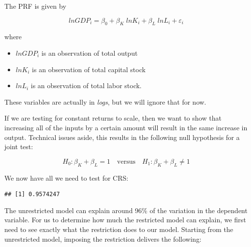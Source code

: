 \documentclass[
]{book}
\newenvironment{Shaded}{\begin{snugshade}}{\end{snugshade}}
\newcommand{\AttributeTok}[1]{\textcolor[rgb]{0.77,0.63,0.00}{#1}}
\newcommand{\CommentTok}[1]{\textcolor[rgb]{0.56,0.35,0.01}{\textit{#1}}}
\newcommand{\FunctionTok}[1]{\textcolor[rgb]{0.00,0.00,0.00}{#1}}
\newcommand{\NormalTok}[1]{#1}
\newcommand{\OtherTok}[1]{\textcolor[rgb]{0.56,0.35,0.01}{#1}}
\newcommand{\SpecialCharTok}[1]{\textcolor[rgb]{0.00,0.00,0.00}{#1}}
\newcommand{\StringTok}[1]{\textcolor[rgb]{0.31,0.60,0.02}{#1}}
\begin{document}
The PRF is given by

\[lnGDP_i = \beta_0 + \beta_K \;lnK_i + \beta_L \;lnL_i + \varepsilon_i\]

where

\begin{itemize}
\item
  \(lnGDP_i\) is an observation of total output
\item
  \(lnK_i\) is an observation of total capital stock
\item
  \(lnL_i\) is an observation of total labor stock.
\end{itemize}

These variables are actually in \emph{logs}, but we will ignore that for now.

If we are testing for constant returns to scale, then we want to show that increasing all of the inputs by a certain amount will result in the same increase in output. Technical issues aside, this results in the following null hypothesis for a joint test:

\[H_0: \beta_K + \beta_L = 1 \quad \text{versus} \quad H_1: \beta_K + \beta_L \neq 1\]

We now have all we need to test for CRS:

\begin{Shaded}
\end{Shaded}

\begin{verbatim}
## [1] 0.9574247
\end{verbatim}

The unrestricted model can explain around 96\% of the variation in the dependent variable. For us to determine how much the restricted model can explain, we first need to see exactly what the restriction does to our model. Starting from the unrestricted model, imposing the restriction delivers the following:
\end{document}
